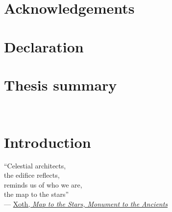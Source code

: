 \documentclass[12pt, twoside, openright]{report}
\begin{document}

\pagestyle{empty}

\cleardoublepage
{}


\newpage\null\thispagestyle{empty}\newpage



\cleardoublepage
{}
\chapter*{Acknowledgements}


\cleardoublepage
{}
\chapter*{Declaration}


\cleardoublepage
{}
\chapter*{Thesis summary}


\cleardoublepage
{}

{
    \hypersetup{linkcolor=black}
    \tableofcontents

    \newpage
    \listoffigures

    \newpage
    \listoftables
}


\newpage
~\newpage
~\newpage

\pagestyle{fancy}

\chapter{Introduction}
\label{chapter: introduction}
\vspace*{2cm}
\vbox{\large``Celestial architects,\\
the edifice reflects,\\
reminds us of who we are,\\
the map to the stars''\\

--- \href{https://xoth.bandcamp.com/album/exogalactic}{Xoth, \textit{Map to the Stars, Monument to the Ancients}}}
\newpage
\noindent

\end{document}
